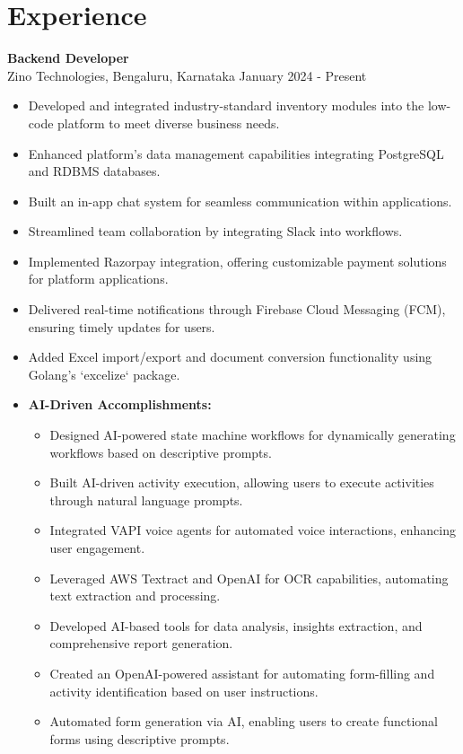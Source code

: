 \documentclass[a4paper,15pt]{article}
\begin{document}
\section*{Experience}
\textbf{Backend Developer} \\
Zino Technologies, Bengaluru, Karnataka \hfill January 2024 - Present
\begin{itemize}[noitemsep, topsep=0pt, leftmargin=*]
    \item Developed and integrated industry-standard inventory modules into the low-code platform to meet diverse business needs.
    \item Enhanced platform's data management capabilities integrating PostgreSQL and RDBMS databases.
    \item Built an in-app chat system for seamless communication within applications.
    \item Streamlined team collaboration by integrating Slack into workflows.
    \item Implemented Razorpay integration, offering customizable payment solutions for platform applications.
    \item Delivered real-time notifications through Firebase Cloud Messaging (FCM), ensuring timely updates for users.
    \item Added Excel import/export and document conversion functionality using Golang's `excelize` package.

    \item \textbf{AI-Driven Accomplishments:}
    \begin{itemize}[noitemsep, topsep=0pt, leftmargin=*]
        \item Designed AI-powered state machine workflows for dynamically generating workflows based on descriptive prompts.
        \item Built AI-driven activity execution, allowing users to execute activities through natural language prompts.
        \item Integrated VAPI voice agents for automated voice interactions, enhancing user engagement.
        \item Leveraged AWS Textract and OpenAI for OCR capabilities, automating text extraction and processing.
        \item Developed AI-based tools for data analysis, insights extraction, and comprehensive report generation.
        \item Created an OpenAI-powered assistant for automating form-filling and activity identification based on user instructions.
        \item Automated form generation via AI, enabling users to create functional forms using descriptive prompts.
    \end{itemize}
\end{itemize}
\end{document}
